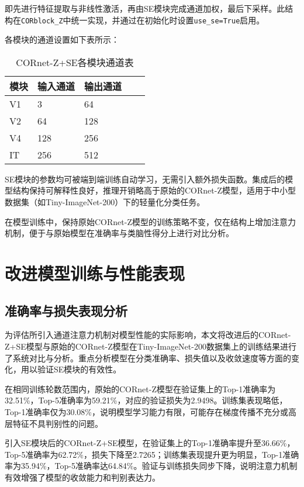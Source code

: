 即先进行特征提取与非线性激活，再由SE模块完成通道加权，最后下采样。此结构在\texttt{CORblock\_Z}中统一实现，并通过在初始化时设置\texttt{use\_se=True}启用。

各模块的通道设置如下表所示：

\begin{table}[htb]
	\centering
	\caption{CORnet-Z+SE各模块通道表}
	\label{tab:CORnet-Z+SE各模块通道表}
	\begin{tabular}{lllll}
		\hline
		模块& 输入通道 & 输出通道 \\
		\hline
		V1 & 3 & 64   \\
		V2 & 64 & 128   \\
		V4 & 128 & 256   \\
		IT & 256 & 512    \\
		\hline
	\end{tabular}
\end{table}

SE模块的参数均可被端到端训练自动学习，无需引入额外损失函数。集成后的模型结构保持可解释性良好，推理开销略高于原始的CORnet-Z模型，适用于中小型数据集（如Tiny-ImageNet-200）下的轻量化分类任务。

在模型训练中，保持原始CORnet-Z模型的训练策略不变，仅在结构上增加注意力机制，便于与原始模型在准确率与类脑性得分上进行对比分析。

\section{改进模型训练与性能表现}

\subsection{准确率与损失表现分析}

为评估所引入通道注意力机制对模型性能的实际影响，本文将改进后的CORnet-Z+SE模型与原始的CORnet-Z模型在Tiny-ImageNet-200数据集上的训练结果进行了系统对比与分析。重点分析模型在分类准确率、损失值以及收敛速度等方面的变化，用以验证SE模块的有效性。

在相同训练轮数范围内，原始的CORnet-Z模型在验证集上的Top-1准确率为32.51\%，Top-5准确率为59.21\%，对应的验证损失为2.9498。训练集表现略低，Top-1准确率仅为30.08\%，说明模型学习能力有限，可能存在梯度传播不充分或高层特征不具判别性的问题。

引入SE模块后的CORnet-Z+SE模型，在验证集上的Top-1准确率提升至36.66\%，Top-5准确率为62.72\%，损失下降至2.7265；训练集表现提升更为明显，Top-1准确率为35.94\%，Top-5准确率达64.84\%。验证与训练损失同步下降，说明注意力机制有效增强了模型的收敛能力和判别表达力。

